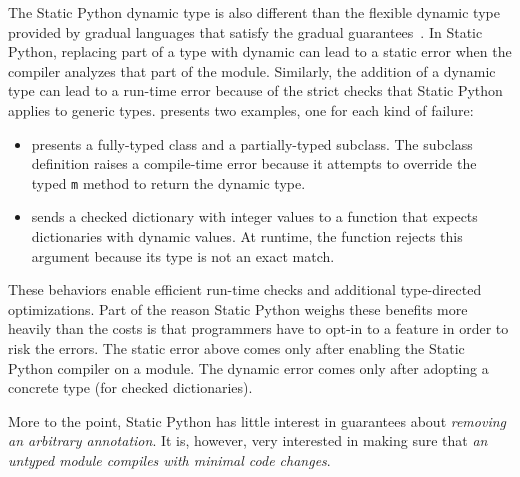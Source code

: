 \documentclass[english,cleveref,submission]{programming}
\newcommand{\SP}{Static Python}
\newcommand{\code}[1]{\texttt{#1}}
\begin{document}
The \SP{} dynamic type is also different than the flexible dynamic type provided
by gradual languages that satisfy the gradual
guarantees~\cite{svcb-snapl-2015}.
In \SP{}, replacing part of a type with dynamic can lead to a static error when
the compiler analyzes that part of the module.
Similarly, the addition of a dynamic type can lead to a run-time error because of the
strict checks that \SP{} applies to generic types.
 presents two examples, one for each kind of failure:
\begin{itemize}
  \item
     presents a fully-typed class and a partially-typed subclass.
    The subclass definition raises a compile-time error because it attempts to override
    the typed \code{m} method to return the dynamic type.

  \item
     sends a checked dictionary with integer values to a
    function that expects dictionaries with dynamic values.
    At runtime, the function rejects this argument because its type is not an
    exact match.
\end{itemize}
These behaviors enable efficient run-time checks and additional type-directed
optimizations.
Part of the reason \SP{} weighs these benefits more heavily than the costs
is that programmers have to opt-in to a feature in order to risk the errors.
The static error above comes only after enabling the \SP{} compiler on a module.
The dynamic error comes only after adopting a concrete type (for checked dictionaries).

More to the point, \SP{} has little interest in guarantees about
\emph{removing an arbitrary annotation}.
It is, however, very interested in making sure that \emph{an untyped
module compiles with minimal code changes}.
\end{document}
